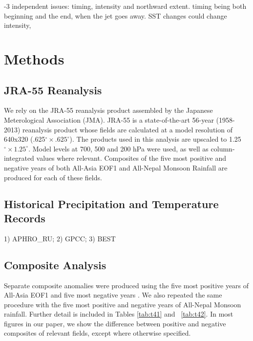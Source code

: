 	-3 independent issues: timing, intensity and northward extent. timing being both beginning and the end, when the jet goes away. SST changes could change intensity, 
	
\section{Methods}

\subsection{JRA-55 Reanalysis}

	We rely on the JRA-55 reanalysis product assembled by the Japanese Meterological Association (JMA). JRA-55 is a state-of-the-art 56-year (1958-2013) reanalysis product whose fields are calculated at a model resolution of 640x320 (.625$^{\circ} \times .625^{\circ}$). The products used in this analysis are upscaled to 1.25$^{\circ} \times 1.25^{\circ}$. Model levels at 700, 500 and 200 hPa were used, as well as column-integrated values where relevant. Composites of the five most positive and negative years of both All-Asia EOF1 and All-Nepal Monsoon Rainfall are produced for each of these fields. 
	
	
\subsection{Historical Precipitation and Temperature Records}

1) APHRO_RU; 2) GPCC; 3) BEST
	
\subsection{Composite Analysis}		
	
	Separate composite anomalies were produced using the five most positive years of All-Asia EOF1 and five most negative years \citep{Day2015}. We also repeated the same procedure with the five most positive and negative years of All-Nepal Monsoon rainfall. Further detail is included in Tables \ref{tab:t41} and ~\ref{tab:t42}. In most figures in our paper, we show the difference between positive and negative composites of relevant fields, except where otherwise specified.
	
